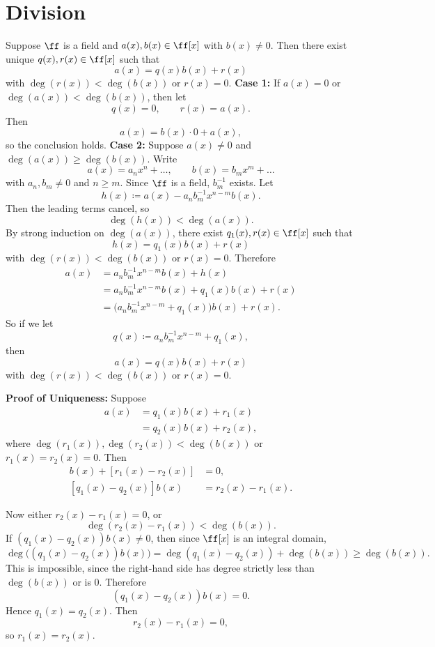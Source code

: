 
\section{Division}

\begin{theorem}{
    Suppose $\ff$ is a field and $a(x),b(x)\in\ff[x]$ with $b(x)\neq 0$.
    Then there exist unique $q(x),r(x)\in\ff[x]$ such that
    \[
        a(x)=q(x)b(x)+r(x)
    \]
    with $\deg(r(x))<\deg(b(x))$ or $r(x)=0$.
}
    \textbf{Case 1:}
    If $a(x)=0$ or $\deg(a(x))<\deg(b(x))$, then let
    \[
        q(x)=0,\qquad r(x)=a(x).
    \]
    Then
    \[
        a(x)=b(x)\cdot 0+a(x),
    \]
    so the conclusion holds.
    \textbf{Case 2:}
    Suppose $a(x)\neq 0$ and $\deg(a(x))\geq \deg(b(x))$.
    Write
    \[
        a(x)=a_{n}x^n+\hdots,
        \qquad
        b(x)=b_{m}x^m+\hdots
    \]
    with $a_n,b_m\neq 0$ and $n\geq m$.
    Since $\ff$ is a field, $b_m^{-1}$ exists.
    Let
    \[
        h(x)\coloneqq a(x)-a_{n}b_m^{-1}x^{n-m}b(x).
    \]
    Then the leading terms cancel, so
    \[
        \deg(h(x))<\deg(a(x)).
    \]
    By strong induction on $\deg(a(x))$, there exist $q_1(x),r(x)\in\ff[x]$ such that
    \[
        h(x)=q_1(x)b(x)+r(x)
    \]
    with $\deg(r(x))<\deg(b(x))$ or $r(x)=0$.
    Therefore
    \begin{align*}
        a(x)
        &=a_{n}b_m^{-1}x^{n-m}b(x)+h(x)\\
        &=a_{n}b_m^{-1}x^{n-m}b(x)+q_1(x)b(x)+r(x)\\
        &=\bigl(a_{n}b_m^{-1}x^{n-m}+q_1(x)\bigr)b(x)+r(x).
    \end{align*}
    So if we let
    \[
        q(x)\coloneqq a_{n}b_m^{-1}x^{n-m}+q_1(x),
    \]
    then
    \[
        a(x)=q(x)b(x)+r(x)
    \]
    with $\deg(r(x))<\deg(b(x))$ or $r(x)=0$.

    \textbf{Proof of Uniqueness:}
    Suppose
    \begin{align*}
        a(x)&=q_1(x)b(x)+r_1(x)\\
        &=q_2(x)b(x)+r_2(x),
    \end{align*}
    where $\deg(r_1(x)),\deg(r_2(x))<\deg(b(x))$ or $r_1(x)=r_2(x)=0$.
    Then
    \begin{align*}
        [q_1(x)-q_2(x)]b(x)+[r_1(x)-r_2(x)]&=0,\\
    [q_1(x)-q_2(x)]b(x)&=r_2(x)-r_1(x).
    \end{align*}

    Now either $r_2(x)-r_1(x)=0$, or
    \[
        \deg(r_2(x)-r_1(x))<\deg(b(x)).
    \]
    If $(q_1(x)-q_2(x))b(x)\neq 0$, then since $\ff[x]$ is an integral domain,
    \[
        \deg\bigl((q_1(x)-q_2(x))b(x)\bigr)=\deg(q_1(x)-q_2(x))+\deg(b(x))\geq \deg(b(x)).
    \]
    This is impossible, since the right-hand side has degree strictly less than $\deg(b(x))$ or is $0$.
    Therefore
    \[
        (q_1(x)-q_2(x))b(x)=0.
    \]
    Hence $q_1(x)=q_2(x)$.
    Then
    \[
        r_2(x)-r_1(x)=0,
    \]
    so $r_1(x)=r_2(x)$.
\end{theorem}

